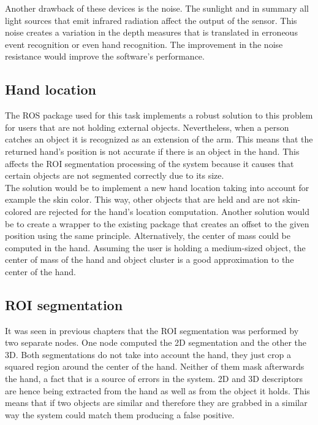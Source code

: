 	Another drawback of these devices is the noise. 
	The sunlight and in summary all light sources that emit infrared radiation affect the output of the sensor. 
	This noise creates a variation in the depth measures that is translated in erroneous event recognition or even hand recognition. 
	The improvement in the noise resistance would improve the software's performance. 


	\subsection{Hand location}

	The ROS package used for this task implements a robust solution to this problem for users that are not holding external objects. 
	Nevertheless, when a person catches an object it is recognized as an extension of the arm.  
	This means that the returned hand's position is not accurate if there is an object in the hand. 
	This affects the ROI segmentation processing of the system because it causes that certain objects are not segmented correctly due to its size.  
	\\

	The solution would be to implement a new hand location taking into account for example the skin color. 
	This way, other objects that are held and are not skin-colored are rejected for the hand's location computation. 
	Another solution would be to create a wrapper to the existing package that creates an offset to the given position using the same principle. 
	Alternatively, the center of mass could be computed in the hand. 
	Assuming the user is holding a medium-sized object, the center of mass of the hand and object cluster is a good approximation to the center of the hand. 
	\\
	
	\subsection{ROI segmentation}

	It was seen in previous chapters that the ROI segmentation was performed by two separate nodes. 
	One node computed the 2D segmentation and the other the 3D. 
	Both segmentations do not take into account the hand, they just crop a squared region around the center of the hand. 
	Neither of them mask afterwards the hand, a fact that is a source of errors in the system. 
	2D and 3D descriptors are hence being extracted from the hand as well as from the object it holds. 
	This means that if two objects are similar and therefore they are grabbed in a similar way the system could match them producing a false positive. 
	\\

